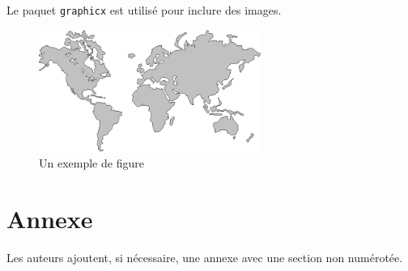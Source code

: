 \documentclass[city=Montpellier,year=2013]{jres}
\begin{document}
Le paquet \texttt{graphicx} est utilisé pour inclure des images.

\begin{figure}
\centerline{\includegraphics[height=4cm]{figure}}
\caption{Un exemple de figure}
\label{fig-exemple}
\end{figure}

\section*{Annexe}

Les auteurs ajoutent, si nécessaire, une annexe avec une section non numérotée.

\nocite{*}

\end{document}
